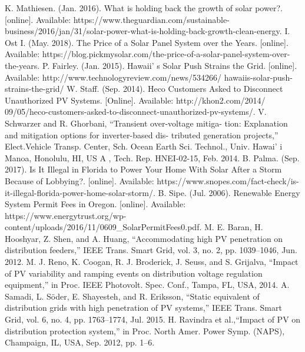 \begin{thebibliography}{00}
   K. Mathiesen. (Jan. 2016). What is holding back the growth of solar power?. [online]. Available: https://www.theguardian.com/sustainable-business/2016/jan/31/solar-power-what-is-holding-back-growth-clean-energy.
   I. Ost I. (May. 2018). The Price of a Solar Panel System over the Years. [online]. Available: https://blog.pickmysolar.com/the-price-of-a-solar-panel-system-over-the-years.
   P. Fairley. (Jan. 2015). Hawaii’ s Solar Push Strains the Grid. [online]. Available: http://www.technologyreview.com/news/534266/ hawaiis-solar-push-strains-the-grid/
   W. Staff. (Sep. 2014). Heco Customers Asked to Disconnect Unauthorized PV Systems. [Online]. Available: http://khon2.com/2014/ 09/05/heco-customers-asked-to-disconnect-unauthorized-pv-systems/.
   V. Schwarzer and R. Ghorbani, “Transient over-voltage mitiga- tion: Explanation and mitigation options for inverter-based dis- tributed generation projects,” Elect.Vehicle Transp. Center, Sch. Ocean Earth Sci. Technol., Univ. Hawai’ i Manoa, Honolulu, HI, US A , Tech. Rep. HNEI-02-15, Feb. 2014.
   B. Palma. (Sep. 2017). Is It Illegal in Florida to Power Your Home With Solar After a Storm Because of Lobbying?. [online]. Available: https://www.snopes.com/fact-check/is-it-illegal-florida-power-home-solar-storm/.
   B. Sipe. (Jul. 2006). Renewable Energy System Permit Fees in Oregon. [online]. Available: https://www.energytrust.org/wp-content/uploads/2016/11/0609\_SolarPermitFees0.pdf.
   M. E. Baran, H. Hooshyar, Z. Shen, and A. Huang, “Accommodating high PV penetration on distribution feeders,” IEEE Trans. Smart Grid, vol. 3, no. 2, pp. 1039–1046, Jun. 2012.
   M. J. Reno, K. Coogan, R. J. Broderick, J. Seuss, and S. Grijalva, “Impact of PV variability and ramping events on distribution voltage regulation equipment,” in Proc. IEEE Photovolt. Spec. Conf., Tampa, FL, USA, 2014.
   A. Samadi, L. Söder, E. Shayesteh, and R. Eriksson, “Static equivalent of distribution grids with high penetration of PV systems,” IEEE Trans. Smart Grid, vol. 6, no. 4, pp. 1763–1774, Jul. 2015.
   H. Ravindra et al.,“Impact of PV on distribution protection system,” in Proc. North Amer. Power Symp. (NAPS), Champaign, IL, USA, Sep. 2012, pp. 1–6.




\end{thebibliography}
